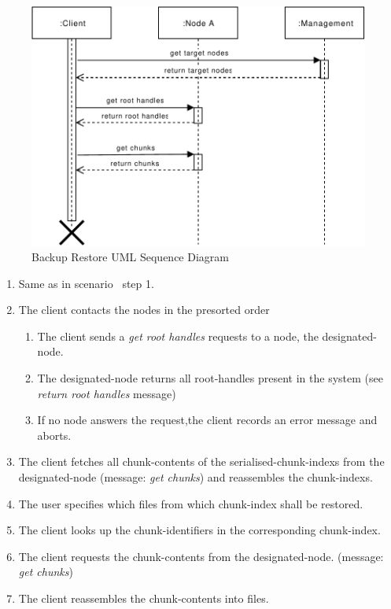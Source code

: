 \begin{figure}[h]
    \centering
    \includegraphics[width=\linewidth]{resources/backup_restore.pdf}
    \caption{Backup Restore UML Sequence Diagram}
    \label{fig:backup-restore}
\end{figure}

\begin{enumerate}
    \item Same as in scenario~ step 1.
    \item The \gls{client} contacts the \glspl{node} in the presorted order
        \begin{enumerate}
            \item The \gls{client} sends a \emph{get root handles} requests to a \gls{node}, the \gls{designated-node}.
            \item The \gls{designated-node} returns all \glspl{root-handle} present in the \gls{system} (see \emph{return root handles} message)
            \item If no \gls{node} answers the request,the \gls{client} records an error message and aborts.
        \end{enumerate}
    \item The \gls{client} fetches all \glspl{chunk-content} of the \glspl{serialised-chunk-index} from the \gls{designated-node} (message: \emph{get chunks}) and reassembles the \glspl{chunk-index}.
    \item The \gls{user} specifies which \glspl{file} from which \gls{chunk-index} shall be restored.
    \item The \gls{client} looks up the \glspl{chunk-identifier} in the corresponding \gls{chunk-index}.
    \item The \gls{client} requests the \glspl{chunk-content} from the \gls{designated-node}. (message: \emph{get chunks})
    \item The \gls{client} reassembles the \glspl{chunk-content} into \glspl{file}.
\end{enumerate}

